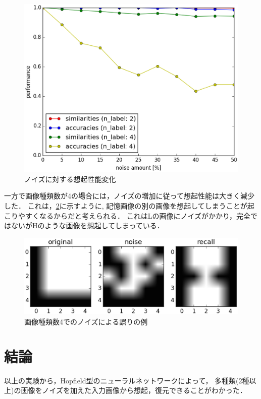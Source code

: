 \documentclass[10pt,twocolumn]{jarticle}
\newcommand{\figref}[1]{\figurename\ref{fig:#1}}
\begin{document}
\begin{figure}[bhtp]
  \centering
    \includegraphics[width=\columnwidth]{figs/noise_performance}
    \caption{ノイズに対する想起性能変化}
    \label{fig:noise-performance}
\end{figure}

一方で画像種類数が4の場合には，ノイズの増加に従って想起性能は大きく減少した．
これは，\figref{noise-label4-wrong-sample}に示すように,
記憶画像の別の画像を想起してしまうことが起こりやすくなるからだと考えられる．
これはLの画像にノイズがかかり，完全ではないがHのような画像を想起してしまっている．

\begin{figure}[thbp]
  \centering
    \includegraphics[width=\columnwidth]{figs/noise_label4_wrong_sample}
    \caption{画像種類数4でのノイズによる誤りの例}
    \label{fig:noise-label4-wrong-sample}
\end{figure}


\section{結論}
以上の実験から，Hopfield型のニューラルネットワークによって，
多種類(2種以上)の画像をノイズを加えた入力画像から想起，復元できることがわかった．
\end{document}
